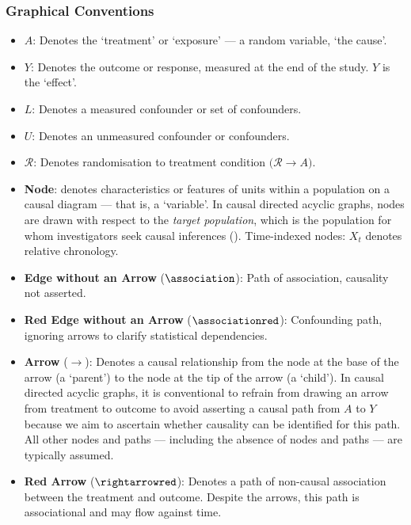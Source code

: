 \documentclass[
  single column]{article}
\begin{document}
\subsubsection{Graphical Conventions}\label{graphical-conventions}

\begin{itemize}
\item
  \textbf{\(A\)}: Denotes the `treatment' or `exposure' --- a random
  variable, `the cause'.
\item
  \textbf{\(Y\)}: Denotes the outcome or response, measured at the end
  of the study. \(Y\) is the `effect'.
\item
  \textbf{\(L\)}: Denotes a measured confounder or set of confounders.
\item
  \textbf{\(U\)}: Denotes an unmeasured confounder or confounders.
\item
  \textbf{\(\mathbf{\mathcal{R}}\)}: Denotes randomisation to treatment
  condition \(\big(\mathcal{R} \rightarrow A\big)\).
\item
  \textbf{Node}: denotes characteristics or features of units within a
  population on a causal diagram --- that is, a `variable'. In causal
  directed acyclic graphs, nodes are drawn with respect to the
  \emph{target population}, which is the population for whom
  investigators seek causal inferences (). Time-indexed nodes: \(X_t\) denotes relative
  chronology.
\item
  \textbf{Edge without an Arrow} (\(\association\)): Path of
  association, causality not asserted.
\item
  \textbf{Red Edge without an Arrow} (\(\associationred\)): Confounding
  path, ignoring arrows to clarify statistical dependencies.
\item
  \textbf{Arrow} (\(\rightarrow\)): Denotes a causal relationship from
  the node at the base of the arrow (a `parent') to the node at the tip
  of the arrow (a `child'). In causal directed acyclic graphs, it is
  conventional to refrain from drawing an arrow from treatment to
  outcome to avoid asserting a causal path from \(A\) to \(Y\) because
  we aim to ascertain whether causality can be identified for this path.
  All other nodes and paths --- including the absence of nodes and paths
  --- are typically assumed.
\item
  \textbf{Red Arrow} (\(\rightarrowred\)): Denotes a path of non-causal
  association between the treatment and outcome. Despite the arrows,
  this path is associational and may flow against time.

\end{itemize}
\end{document}
